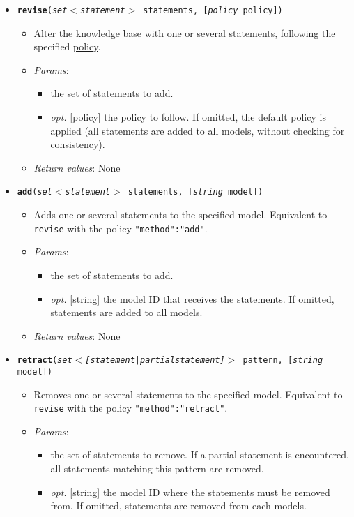 \begin{itemize}
\item  \texttt{\textbf{revise}(\emph{set$<$statement$>$} statements, [\emph{policy} policy])}
\begin{itemize}
\item  Alter the knowledge base with one or several statements, following the specified \hyperref[94422fa6b0fe23d0ab463703c0022a63]{policy}.
\item  \emph{Params}:
\begin{itemize}
\item  [set$<$statement$>$] the set of statements to add.
\item  \emph{opt.} [policy] the policy to follow. If omitted, the default policy is applied (all statements are added to all models, without checking for consistency). 
\end{itemize}

\item  \emph{Return values}: None
\end{itemize}

\item  \texttt{\textbf{add}(\emph{set$<$statement$>$} statements, [\emph{string} model])}
\begin{itemize}
\item  Adds one or several statements to the specified model. Equivalent to \texttt{revise} with the policy \texttt{{"method":"add"}}.
\item  \emph{Params}:
\begin{itemize}
\item  [set$<$statement$>$] the set of statements to add.
\item  \emph{opt.} [string] the model ID that receives the statements. If omitted, statements are added to all models. 
\end{itemize}

\item  \emph{Return values}: None
\end{itemize}

\item  \texttt{\textbf{retract}(\emph{set$<$[statement|partial{\textunderscore}statement]$>$} pattern, [\emph{string} model])}
\begin{itemize}
\item  Removes one or several statements to the specified model. Equivalent to \texttt{revise} with the policy \texttt{{"method":"retract"}}.
\item  \emph{Params}:
\begin{itemize}
\item  [set$<$statement|partial{\textunderscore}statement$>$] the set of statements to remove. If a partial statement is encountered, all statements matching this pattern are removed.
\item  \emph{opt.} [string] the model ID where the statements must be removed from. If omitted, statements are removed from each models. 
\end{itemize}


\end{itemize}
\end{itemize}
